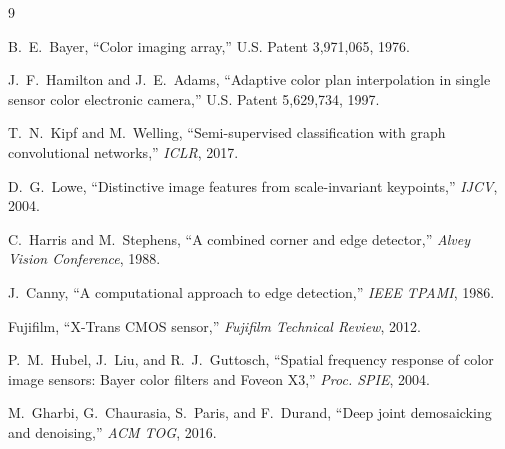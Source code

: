 \documentclass[10pt,twocolumn,letterpaper]{article}
\begin{document}

\begin{thebibliography}{9}

B.~E.~Bayer, ``Color imaging array,'' U.S. Patent 3,971,065, 1976.

J.~F.~Hamilton and J.~E.~Adams, ``Adaptive color plan interpolation in single sensor color electronic camera,'' U.S. Patent 5,629,734, 1997.

T.~N.~Kipf and M.~Welling, ``Semi-supervised classification with graph convolutional networks,'' \textit{ICLR}, 2017.

D.~G.~Lowe, ``Distinctive image features from scale-invariant keypoints,'' \textit{IJCV}, 2004.

C.~Harris and M.~Stephens, ``A combined corner and edge detector,'' \textit{Alvey Vision Conference}, 1988.

J.~Canny, ``A computational approach to edge detection,'' \textit{IEEE TPAMI}, 1986.

Fujifilm, ``X-Trans CMOS sensor,'' \textit{Fujifilm Technical Review}, 2012.

P.~M.~Hubel, J.~Liu, and R.~J.~Guttosch, ``Spatial frequency response of color image sensors: Bayer color filters and Foveon X3,'' \textit{Proc. SPIE}, 2004.

M.~Gharbi, G.~Chaurasia, S.~Paris, and F.~Durand, ``Deep joint demosaicking and denoising,'' \textit{ACM TOG}, 2016.

\end{thebibliography}
\end{document}
